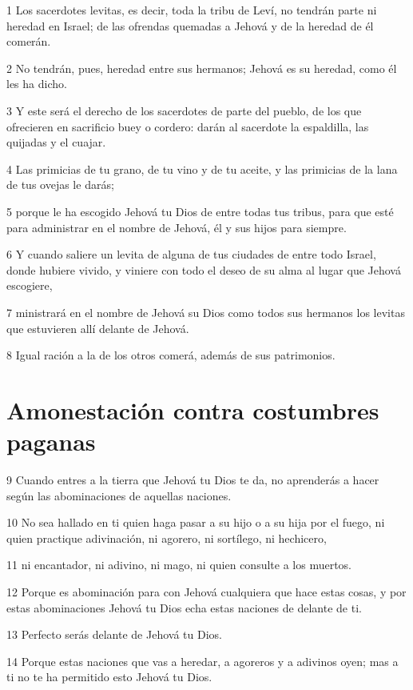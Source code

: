 \par 1 Los sacerdotes levitas, es decir, toda la tribu de Leví, no tendrán parte ni heredad en Israel; de las ofrendas quemadas a Jehová y de la heredad de él comerán.
\par 2 No tendrán, pues, heredad entre sus hermanos; Jehová es su heredad, como él les ha dicho. 
\par 3 Y este será el derecho de los sacerdotes de parte del pueblo, de los que ofrecieren en sacrificio buey o cordero: darán al sacerdote la espaldilla, las quijadas y el cuajar.
\par 4 Las primicias de tu grano, de tu vino y de tu aceite, y las primicias de la lana de tus ovejas le darás;
\par 5 porque le ha escogido Jehová tu Dios de entre todas tus tribus, para que esté para administrar en el nombre de Jehová, él y sus hijos para siempre.
\par 6 Y cuando saliere un levita de alguna de tus ciudades de entre todo Israel, donde hubiere vivido, y viniere con todo el deseo de su alma al lugar que Jehová escogiere,
\par 7 ministrará en el nombre de Jehová su Dios como todos sus hermanos los levitas que estuvieren allí delante de Jehová.
\par 8 Igual ración a la de los otros comerá, además de sus patrimonios.

\section{Amonestación contra costumbres paganas}

\par 9 Cuando entres a la tierra que Jehová tu Dios te da, no aprenderás a hacer según las abominaciones de aquellas naciones.
\par 10 No sea hallado en ti quien haga pasar a su hijo o a su hija por el fuego, ni quien practique adivinación, ni agorero, ni sortílego, ni hechicero,
\par 11 ni encantador, ni adivino, ni mago, ni quien consulte a los muertos.
\par 12 Porque es abominación para con Jehová cualquiera que hace estas cosas, y por estas abominaciones Jehová tu Dios echa estas naciones de delante de ti.
\par 13 Perfecto serás delante de Jehová tu Dios. 
\par 14 Porque estas naciones que vas a heredar, a agoreros y a adivinos oyen; mas a ti no te ha permitido esto Jehová tu Dios.

